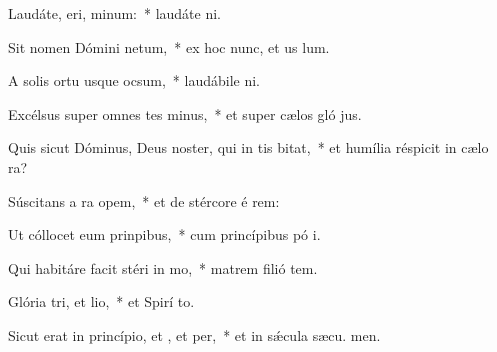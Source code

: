 \item Laudáte, eri, minum:~* laudáte  ni.
\item Sit nomen Dómini netum,~* ex hoc nunc, et us  lum.
\item A solis ortu usque  ocsum,~* laudábile  ni.
\item Excélsus super omnes tes minus,~* et super cælos gló jus.
\item Quis sicut Dóminus, Deus noster, qui in tis bitat,~* et humília réspicit in cælo   ra?
\item Súscitans a ra opem,~* et de stércore é rem:
\item Ut cóllocet eum  prinpibus,~* cum princípibus pó i.
\item Qui habitáre facit stéri in mo,~* matrem filió tem.
\item Glória tri, et lio,~* et Spirí to.
\item Sicut erat in princípio, et , et per,~* et in sǽcula sæcu. men.
